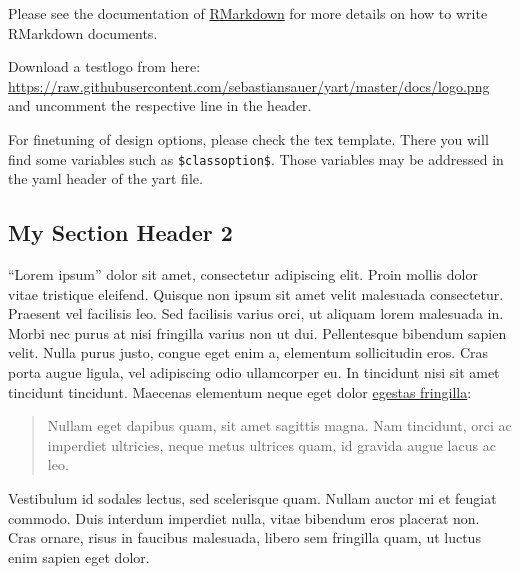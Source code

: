 \documentclass[11pt,english,a4paper,oneside]{article}
\begin{document}
Please see the documentation of
\href{http://rmarkdown.rstudio.com/}{RMarkdown} for more details on how
to write RMarkdown documents.

Download a testlogo from here:
\url{https://raw.githubusercontent.com/sebastiansauer/yart/master/docs/logo.png}
and uncomment the respective line in the header.

For finetuning of design options, please check the tex template. There
you will find some variables such as \texttt{\$classoption\$}. Those
variables may be addressed in the yaml header of the yart file.

\hypertarget{my-section-header-2}{%
\subsection{My Section Header 2}\label{my-section-header-2}}

\enquote{Lorem ipsum} dolor sit amet, consectetur adipiscing elit. Proin
mollis dolor vitae tristique eleifend. Quisque non ipsum sit amet velit
malesuada consectetur. Praesent vel facilisis leo. Sed facilisis varius
orci, ut aliquam lorem malesuada in. Morbi nec purus at nisi fringilla
varius non ut dui. Pellentesque bibendum sapien velit. Nulla purus
justo, congue eget enim a, elementum sollicitudin eros. Cras porta augue
ligula, vel adipiscing odio ullamcorper eu. In tincidunt nisi sit amet
tincidunt tincidunt. Maecenas elementum neque eget dolor
\href{http://example.com}{egestas fringilla}:

\begin{quote}
Nullam eget dapibus quam, sit amet sagittis magna. Nam tincidunt, orci
ac imperdiet ultricies, neque metus ultrices quam, id gravida augue
lacus ac leo.
\end{quote}

Vestibulum id sodales lectus, sed scelerisque quam. Nullam auctor mi et
feugiat commodo. Duis interdum imperdiet nulla, vitae bibendum eros
placerat non. Cras ornare, risus in faucibus malesuada, libero sem
fringilla quam, ut luctus enim sapien eget dolor.
\end{document}
